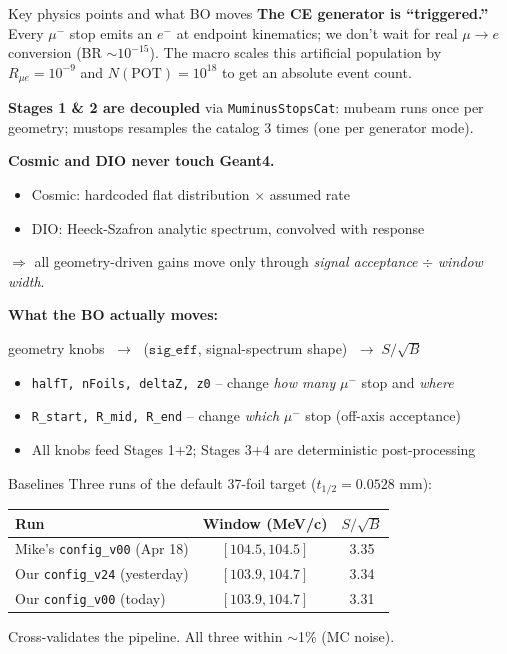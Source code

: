 \documentclass[10pt,aspectratio=169]{beamer}
\begin{document}
\begin{frame}{Key physics points and what BO moves}
\textbf{The CE generator is ``triggered.''} Every $\mu^-$ stop emits an $e^-$ at
endpoint kinematics; we don't wait for real $\mu \to e$ conversion (BR $\sim 10^{-15}$).
The macro scales this artificial population by $R_{\mu e} = 10^{-9}$ and
$N(\mathrm{POT}) = 10^{18}$ to get an absolute event count.

\medskip
\textbf{Stages 1 \& 2 are decoupled} via \texttt{MuminusStopsCat}: mubeam runs once per
geometry; mustops resamples the catalog 3 times (one per generator mode).

\medskip
\textbf{Cosmic and DIO never touch Geant4.}
\begin{itemize}\itemsep=0pt
\item Cosmic: hardcoded flat distribution $\times$ assumed rate
\item DIO: Heeck-Szafron analytic spectrum, convolved with response
\end{itemize}
$\Rightarrow$ all geometry-driven gains move only through
\emph{signal acceptance} $\div$ \emph{window width}.

\medskip
\textbf{What the BO actually moves:}
\smallskip
\begin{center}
geometry knobs $\;\to\;$ ($\mathtt{sig\_eff}$, signal-spectrum shape) $\;\to\; S/\sqrt{B}$
\end{center}

\smallskip
\begin{itemize}\itemsep=0pt
\item \texttt{halfT, nFoils, deltaZ, z0} -- change \emph{how many} $\mu^-$ stop and \emph{where}
\item \texttt{R\_start, R\_mid, R\_end} -- change \emph{which} $\mu^-$ stop (off-axis acceptance)
\item All knobs feed Stages 1+2; Stages 3+4 are deterministic post-processing
\end{itemize}
\end{frame}

\begin{frame}{Baselines}
Three runs of the default 37-foil target ($t_{1/2}=0.0528$ mm):

\medskip
\begin{tabular}{lcc}
\toprule
Run & Window (MeV/c) & $S/\sqrt{B}$ \\
\midrule
Mike's \texttt{config\_v00} (Apr 18) & $[104.5, 104.5]$  & 3.35 \\
Our \texttt{config\_v24} (yesterday) & $[103.9, 104.7]$  & 3.34 \\
Our \texttt{config\_v00} (today)     & $[103.9, 104.7]$  & 3.31 \\
\bottomrule
\end{tabular}

\medskip
Cross-validates the pipeline. All three within $\sim$1\% (MC noise).
\end{frame}
\end{document}
